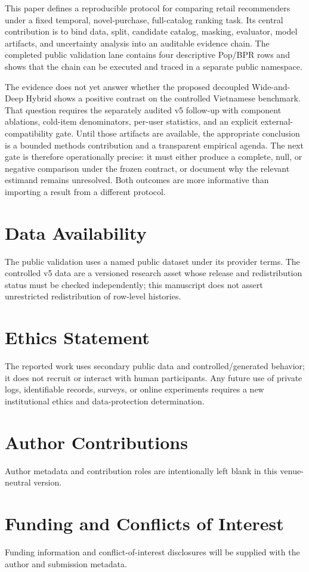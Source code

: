 \documentclass[10pt,a4paper]{article}
\begin{document}
This paper defines a reproducible protocol for comparing retail recommenders
under a fixed temporal, novel-purchase, full-catalog ranking task. Its central
contribution is to bind data, split, candidate catalog, masking, evaluator,
model artifacts, and uncertainty analysis into an auditable evidence chain. The
completed public validation lane contains four descriptive Pop/BPR rows and
shows that the chain can be executed and traced in a separate public namespace.

The evidence does not yet answer whether the proposed decoupled Wide-and-Deep
Hybrid shows a positive contrast on the controlled Vietnamese benchmark. That question requires
the separately audited v5 follow-up with component ablations, cold-item
denominators, per-user statistics, and an explicit external-compatibility gate.
Until those artifacts are available, the appropriate conclusion is a bounded
methods contribution and a transparent empirical agenda.
The next gate is therefore operationally precise: it must either produce a
complete, null, or negative comparison under the frozen contract, or document
why the relevant estimand remains unresolved. Both outcomes are more
informative than importing a result from a different protocol.

\section*{Data Availability}

The public validation uses a named public dataset under its provider terms. The
controlled v5 data are a versioned research asset whose release and
redistribution status must be checked independently; this manuscript does not
assert unrestricted redistribution of row-level histories.

\section*{Ethics Statement}

The reported work uses secondary public data and controlled/generated behavior;
it does not recruit or interact with human participants. Any future use of
private logs, identifiable records, surveys, or online experiments requires a
new institutional ethics and data-protection determination.

\section*{Author Contributions}

Author metadata and contribution roles are intentionally left blank in this
venue-neutral version.

\section*{Funding and Conflicts of Interest}

Funding information and conflict-of-interest disclosures will be supplied with
the author and submission metadata.



\end{document}
